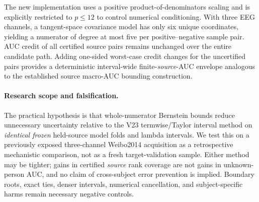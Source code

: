 The new implementation uses a positive product-of-denominators
scaling and is explicitly restricted to $p\le12$ to
control numerical conditioning. With three EEG channels,
a tangent-space covariance model has only six unique
coordinates, yielding a numerator of degree at most
five per positive--negative sample pair. AUC credit of
all certified source pairs remains unchanged over the
entire candidate path. Adding one-sided worst-case
credit changes for the uncertified pairs provides a
deterministic interval-wide finite-\emph{source}-AUC
envelope analogous to the established source macro-AUC bounding construction.

\paragraph{Research scope and falsification.}
The practical hypothesis is that whole-numerator
Bernstein bounds reduce unnecessary uncertainty relative
to the V23 termwise/Taylor interval method on
\emph{identical frozen} held-source model folds and
lambda intervals. We test this on a previously exposed
three-channel Weibo2014 acquisition as a retrospective
mechanistic comparison, not as a fresh target-validation
sample. Either method may be tighter; gains in certified
\emph{source} rank coverage are not gains in unknown-person
AUC, and no claim of cross-subject error prevention
is implied. Boundary roots, exact ties, denser intervals,
numerical cancellation, and subject-specific harms remain
necessary negative controls.
